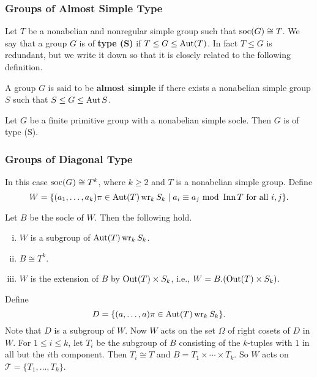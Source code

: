 \subsubsection{Groups of Almost Simple Type} Let $T$ be a nonabelian and nonregular simple group such that $\operatorname{soc}(G) \cong T$. We say that a group $G$ is of \textbf{type (S)} if $T\leq G\leq \operatorname{Aut}(T)$. In fact $T\leq G$ is redundant, but we write it down so that it is closely related to the following definition.
\begin{definition}
	A group $G$ is said to be \textbf{almost simple} if there exists a nonabelian simple group $S$ such that $S\leq G\leq \operatorname{Aut} S$.
\end{definition}


\begin{proposition} \label{prop-type-S}
	Let $G$ be a finite primitive group with a nonabelian simple socle. Then $G$ is of type (S).
\end{proposition}






\subsubsection{Groups of Diagonal Type} \label{sec-diagonal-type} In this case $\operatorname{soc}(G)\cong T^k$, where $k\geq 2$ and $T$ is a nonabelian simple group. Define
\begin{equation*}
	W = \{(a_1,\dots, a_k)\pi\in \operatorname{Aut} (T)\operatorname{wr}_k S_k\mid a_i\equiv a_j \text{ mod } \operatorname{Inn} T \text{ for all }i,j\}.
\end{equation*}
\begin{proposition}
	Let $B$ be the socle of $W$. Then the following hold.
	\begin{enumerate}[(i)]
		\item $W$ is a subgroup of $\operatorname{Aut} (T)\operatorname{wr}_k S_k$.
		\item $B\cong T^k$.
		\item $W$ is the extension of $B$ by $\operatorname{Out}(T)\times S_k$, i.e., $W = B.(\operatorname{Out}(T)\times S_k)$.
	\end{enumerate}
\end{proposition}
Define
\begin{equation*}
	D = \{(a,\dots, a)\pi\in \operatorname{Aut} (T)\operatorname{wr}_k S_k\}.
\end{equation*}
Note that $D$ is a subgroup of $W$.  Now $W$ acts on the set $\Omega$ of right cosets of $D$ in $W$. For $1\leq i\leq k$, let $T_i$ be the subgroup of $B$ consisting of the $k$-tuples with $1$ in all but the $i$th component. Then $T_i\cong T$ and $B = T_1\times \cdots \times T_k$. So $W$ acts on $\mathcal{T} = \{T_1,\dots, T_k\}$. 

